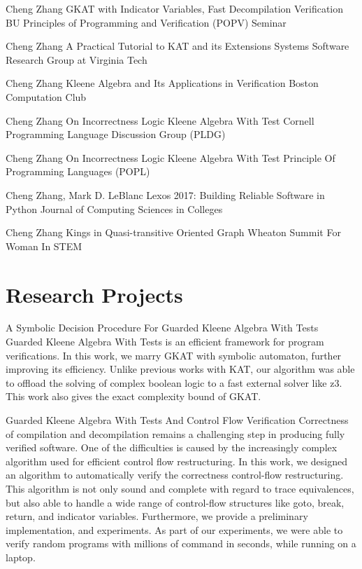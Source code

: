 \documentclass[11pt,roman]{moderncv}        %
\begin{document}
{Cheng Zhang}
{GKAT with Indicator Variables, Fast Decompilation Verification}
{BU Principles of Programming and Verification (POPV) Seminar}
{}{}

{Cheng Zhang}
{A Practical Tutorial to KAT and its Extensions}
{Systems Software Research Group at Virginia Tech}
{}{}

{Cheng Zhang}
{Kleene Algebra and Its Applications in Verification}
{Boston Computation Club}
{}{}

{Cheng Zhang}
{On Incorrectness Logic Kleene Algebra With Test}
{Cornell Programming Language Discussion Group (PLDG)}
{}{}

{Cheng Zhang}
{On Incorrectness Logic Kleene Algebra With Test}
{Principle Of Programming Languages (POPL)}
{}{}

{Cheng Zhang, Mark D. LeBlanc}
{Lexos 2017: Building Reliable Software in Python}
{Journal of Computing Sciences in Colleges}
{}{}

{Cheng Zhang}
{Kings in Quasi-transitive Oriented Graph}
{Wheaton Summit For Woman In STEM}
{}{}

\section{Research Projects}

{A Symbolic Decision Procedure For Guarded Kleene Algebra With Tests}
{}{}{}
{Guarded Kleene Algebra With Tests is an efficient framework for program verifications. In this work, we marry GKAT with symbolic automaton, further improving its efficiency.
Unlike previous works with KAT, our algorithm was able to offload the solving of complex boolean logic to a fast external solver like z3.
This work also gives the exact complexity bound of GKAT.}

{Guarded Kleene Algebra With Tests And Control Flow Verification}
{}{}{}
{Correctness of compilation and decompilation remains a challenging step in producing fully verified software. 
One of the difficulties is caused by the increasingly complex algorithm used for efficient control flow restructuring.
In this work, we designed an algorithm to automatically verify the correctness control-flow restructuring. This algorithm is not only sound and complete with regard to trace equivalences, but also able to handle a wide range of control-flow structures like goto, break, return, and indicator variables. 
Furthermore, we provide a preliminary implementation, and experiments. As part of our experiments, we were able to verify random programs with millions of command in seconds, while running on a laptop.}
\end{document}

